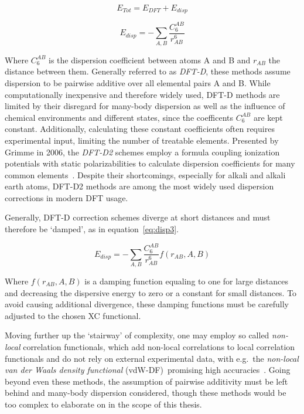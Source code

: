 \documentclass[12pt]{article}
\begin{document}
\begin{equation}
  E_{Tot} = E_{DFT} + E_{disp}
  \label{eq:disp1}
\end{equation}

\begin{equation}
  E_{disp} = - \sum_{A,B}\frac{C_{6}^{AB}}{r^6_{AB}}
  \label{eq:disp2}
\end{equation}

\bigskip

\noindent Where $C_{6}^{AB}$ is the dispersion coefficient between atoms A and B and $r_{AB}$ the distance between them.
Generally referred to as \textit{DFT-D}, these methods assume dispersion to be pairwise additive over all elemental pairs A and B.
While computationally inexpensive and therefore widely used, DFT-D methods are limited by their disregard for many-body dispersion as well as the influence of chemical environments and different states, since the coefficents $C_{6}^{AB}$ are kept constant.
Additionally, calculating these constant coefficients often requires experimental input, limiting the number of treatable elements.
Presented by Grimme in 2006, the \textit{DFT-D2} schemes employ a formula coupling ionization potentials with static polarizabilities to calculate dispersion coefficients for many common elements~\cite{Grimme2006}.
Despite their shortcomings, especially for alkali and alkali earth atoms, DFT-D2 methods are among the most widely used dispersion corrections in modern DFT usage.
\\ \par \noindent Generally, DFT-D correction schemes diverge at short distances and must therefore be `damped', as in equation~\ref{eq:disp3}.

\begin{equation}
  E_{disp} = - \sum_{A,B}\frac{C_{6}^{AB}}{r^6_{AB}}f(r_{AB},A,B)
  \label{eq:disp3}
\end{equation}

\bigskip

\noindent Where $f(r_{AB},A,B)$ is a damping function equaling to one for large distances and decreasing the dispersive energy to zero or a constant for small distances.
To avoid causing additional divergence, these damping functions must be carefully adjusted to the chosen XC functional.
\\ \par \noindent Moving further up the `stairway' of complexity, one may employ so called \textit{non-local} correlation functionals, which add non-local correlations to local correlation functionals and do not rely on external experimental data, with e.g.~the \textit{non-local van der Waals density functional} (vdW-DF)~promising high accuracies~\cite{Klime2009_vdW-DF}.
Going beyond even these methods, the assumption of pairwise additivity must be left behind and many-body dispersion considered, though these methods would be too complex to elaborate on in the scope of this thesis.
\end{document}
